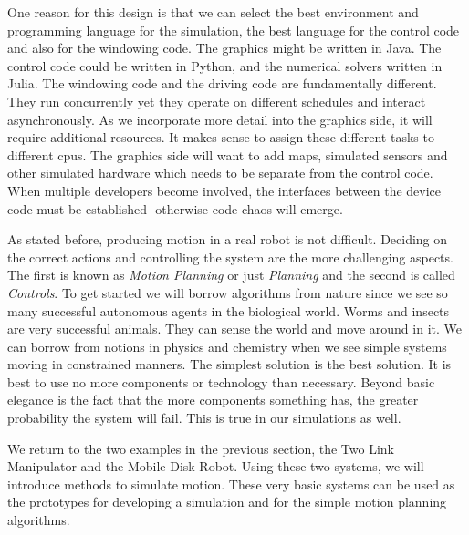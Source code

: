 One reason for this design is that we can select the best environment
and programming language for the simulation, the best language for the
control code and also for the windowing code. The graphics might be
written in Java. The control code could be written in Python, and the
numerical solvers written in Julia. The windowing code and the driving
code are fundamentally different. They run concurrently yet they operate
on different schedules and interact asynchronously. As we incorporate
more detail into the graphics side, it will require additional
resources. It makes sense to assign these different tasks to different
cpus. The graphics side will want to add maps, simulated sensors and
other simulated hardware which needs to be separate from the control
code. When multiple developers become involved, the interfaces between
the device code must be established -otherwise code chaos will emerge.

As stated before, producing motion in a real robot is not difficult.
Deciding on the correct actions and controlling the system are the more
challenging aspects. The first is known as \emph{Motion Planning} or
just \emph{Planning} and the second is called \emph{Controls}. To get
started we will borrow algorithms from nature since we see so many
successful autonomous agents in the biological world. Worms and insects
are very successful animals. They can sense the world and move around in
it. We can borrow from notions in physics and chemistry when we see
simple systems moving in constrained manners. The simplest solution is
the best solution. It is best to use no more components or technology
than necessary. Beyond basic elegance is the fact that the more
components something has, the greater probability the system will fail.
This is true in our simulations as well.

We return to the two examples in the previous section, the Two Link
Manipulator and the Mobile Disk Robot. Using these two systems, we will
introduce methods to simulate motion. These very basic systems can be
used as the prototypes for developing a simulation and for the simple
motion planning algorithms.
